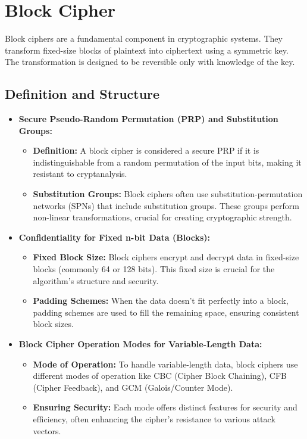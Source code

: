 \chapter{Block Cipher}
Block ciphers are a fundamental component in cryptographic systems. They transform fixed-size blocks of plaintext into ciphertext using a symmetric key. The transformation is designed to be reversible only with knowledge of the key.

\section{Definition and Structure}

\begin{itemize}
	\item \textbf{Secure Pseudo-Random Permutation (PRP) and Substitution Groups:}
	\begin{itemize}
		\item \textbf{Definition:} A block cipher is considered a secure PRP if it is indistinguishable from a random permutation of the input bits, making it resistant to cryptanalysis.
		\item \textbf{Substitution Groups:} Block ciphers often use substitution-permutation networks (SPNs) that include substitution groups. These groups perform non-linear transformations, crucial for creating cryptographic strength.
	\end{itemize}
	\item \textbf{Confidentiality for Fixed n-bit Data (Blocks):} 
	\begin{itemize}
		\item \textbf{Fixed Block Size:} Block ciphers encrypt and decrypt data in fixed-size blocks (commonly 64 or 128 bits). This fixed size is crucial for the algorithm's structure and security.
		\item \textbf{Padding Schemes:} When the data doesn't fit perfectly into a block, padding schemes are used to fill the remaining space, ensuring consistent block sizes.
	\end{itemize}
	\item \textbf{Block Cipher Operation Modes for Variable-Length Data:} 
	\begin{itemize}
		\item \textbf{Mode of Operation:} To handle variable-length data, block ciphers use different modes of operation like CBC (Cipher Block Chaining), CFB (Cipher Feedback), and GCM (Galois/Counter Mode).
		\item \textbf{Ensuring Security:} Each mode offers distinct features for security and efficiency, often enhancing the cipher's resistance to various attack vectors.

\end{itemize}
\end{itemize}
